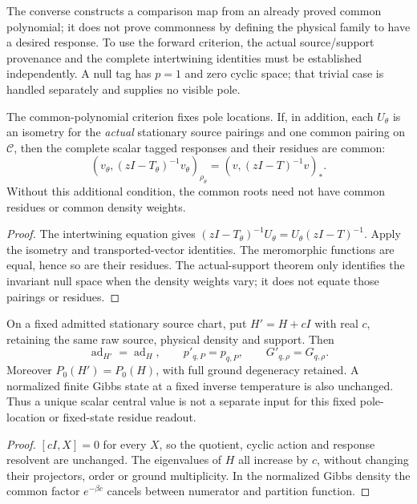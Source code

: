 \documentclass[12pt,a4paper]{article}
\begin{document}
The converse constructs a comparison map from an already proved common
polynomial; it does not prove commonness by defining the physical family
to have a desired response.  To use the forward criterion, the actual
source/support provenance and the complete intertwining identities must
be established independently.  A null tag has $p=1$ and zero cyclic space;
that trivial case is handled separately and supplies no visible pole.

\begin{corollary}
\label{p4:cor:v2186-source-cyclic-residue-scope}
The common-polynomial criterion fixes pole locations.  If, in addition,
each $U_\theta$ is an isometry for the \emph{actual} stationary source
pairings and one common pairing on $\mathscr C$, then the complete scalar
tagged responses and their residues are common:
\[
 (v_\theta,(zI-T_\theta)^{-1}v_\theta)_{\rho_\theta}
 =(v,(zI-T)^{-1}v)_*.
\]
Without this additional condition, the common roots need not have common
residues or common density weights.
\end{corollary}
\begin{proof}
The intertwining equation gives
$(zI-T_\theta)^{-1}U_\theta=U_\theta(zI-T)^{-1}$.
Apply the isometry and transported-vector identities.  The meromorphic
functions are equal, hence so are their residues.  The actual-support
theorem only identifies the invariant null space when the density weights
vary; it does not equate those pairings or residues.
\end{proof}

\begin{corollary}
\label{p4:cor:v2186-scalar-center-pole-invisibility}
On a fixed admitted stationary source chart, put $H'=H+cI$ with real
$c$, retaining the same raw source, physical density and support.  Then
\[
 \boxed{\operatorname{ad}_{H'}=\operatorname{ad}_H,\qquad
          p'_{q,P}=p_{q,P},\qquad G'_{q,\rho}=G_{q,\rho}.}
\]
Moreover $P_0(H')=P_0(H)$, with full ground degeneracy retained.  A
normalized finite Gibbs state at a fixed inverse temperature is also
unchanged.  Thus a unique scalar central value is not a separate input
for this fixed pole-location or fixed-state residue readout.
\end{corollary}
\begin{proof}
$[cI,X]=0$ for every $X$, so the quotient, cyclic action and response
resolvent are unchanged.  The eigenvalues of $H$ all increase by $c$,
without changing their projectors, order or ground multiplicity.
In the normalized Gibbs density the common factor $e^{-\beta c}$
cancels between numerator and partition function.
\end{proof}
\end{document}
